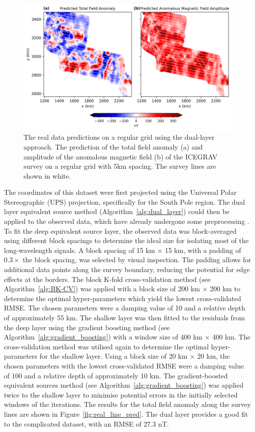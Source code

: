 \begin{figure}[tb!]
\centering
\includegraphics[width=1\linewidth]{figures/real_grid_pred.png}
\caption{
    The real data predictions on a regular grid using the dual-layer approach. The prediction of the total field anomaly (a) and amplitude of the anomalous magnetic field (b) of the ICEGRAV survey \citep{ICEGRAV_data} on a regular grid with 5km spacing. The survey lines are shown in white.
}
\label{fig:real_grid_pred}
\end{figure}

The coordinates of this dataset were first projected using the Universal Polar Stereographic (UPS) projection, specifically for the South Pole region. The dual layer equivalent source method (Algorithm~\ref{alg:dual_layer}) could then be applied to the observed data, which have already undergone some preprocessing \citep{ICEGRAV_data}. To fit the deep equivalent source layer, the observed data was block-averaged using different block spacings to determine the ideal size for isolating most of the long-wavelength signals. A block spacing of 15 km $\times$ 15 km, with a padding of $ 0.3 \times $ the block spacing, was selected by visual inspection. The padding allows for additional data points along the survey boundary, reducing the potential for edge effects at the borders. The block K-fold cross-validation method (see Algorithm~\ref{alg:BK-CV}) was applied with a block size of 200 km $\times$ 200 km to determine the optimal hyper-parameters which yield the lowest cross-validated RMSE. The chosen parameters were a damping value of 10 and a relative depth of approximately 55 km. The shallow layer was then fitted to the residuals from the deep layer using the gradient boosting method (see Algorithm~\ref{alg:gradient_boosting}) with a window size of 400 km $\times$ 400 km. The cross-validation method was utilised again to determine the optimal hyper-parameters for the shallow layer. Using a block size of 20 km $\times$ 20 km, the chosen parameters with the lowest cross-validated RMSE were a damping value of 100 and a relative depth of approximately 10 km. The gradient-boosted equivalent sources method (see Algorithm~\ref{alg:gradient_boosting}) was applied twice to the shallow layer to minimise potential errors in the initially selected windows of the iterations. The results for the total field anomaly along the survey lines are shown in Figure~\ref{fig:real_line_pred}. The dual layer provides a good fit to the complicated dataset, with an RMSE of 27.3 nT.

